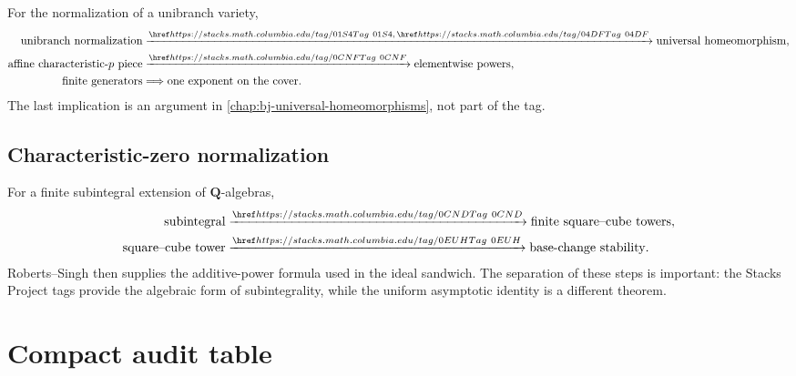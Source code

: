 For the normalization of a unibranch variety,
\[
\begin{aligned}
\text{unibranch normalization}
 &\xrightarrow{\stacktag{01S4},\,\stacktag{04DF}}
 \text{universal homeomorphism},\\
\text{affine characteristic-\(p\) piece}
 &\xrightarrow{\stacktag{0CNF}}
 \text{elementwise powers},\\
\text{finite generators}
 &\Longrightarrow
 \text{one exponent on the cover}.
\end{aligned}
\]
The last implication is an argument in \cref{chap:bj-universal-homeomorphisms},
not part of the tag.

\subsection*{Characteristic-zero normalization}
\label{sec:stacks-subintegral-chain}

For a finite subintegral extension of \(\mathbf Q\)-algebras,
\[
\begin{aligned}
\text{subintegral}
 &\xrightarrow{\stacktag{0CND}}
 \text{finite square--cube towers},\\
\text{square--cube tower}
 &\xrightarrow{\stacktag{0EUH}}
 \text{base-change stability}.
\end{aligned}
\]
Roberts--Singh then supplies the additive-power formula used in the ideal
sandwich. The separation of these steps is important: the Stacks Project
tags provide the algebraic form of subintegrality, while the uniform
asymptotic identity is a different theorem.

\section{Compact audit table}
\label{sec:stacks-compact-table}

